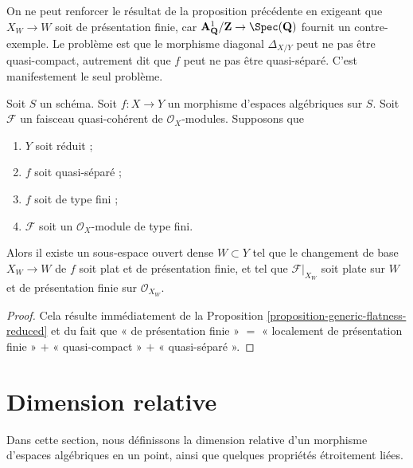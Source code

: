 \noindent
On ne peut renforcer le résultat de la proposition précédente en exigeant que
$X_W \to W$ soit de présentation finie, car
$\mathbf{A}^1_{\mathbf{Q}}/\mathbf{Z} \to \Spec(\mathbf{Q})$
fournit un contre-exemple. Le problème est que le morphisme diagonal
$\Delta_{X/Y}$ peut ne pas être quasi-compact, autrement dit que $f$ peut ne pas être
quasi-séparé. C'est manifestement le seul problème.

\begin{proposition}
\label{proposition-generic-flatness-reduced-quasi-separated}
Soit $S$ un schéma.
Soit $f : X \to Y$ un morphisme d'espaces algébriques sur $S$.
Soit $\mathcal{F}$ un faisceau quasi-cohérent de $\mathcal{O}_X$-modules.
Supposons que
\begin{enumerate}
\item $Y$ soit réduit ;
\item $f$ soit quasi-séparé ;
\item $f$ soit de type fini ;
\item $\mathcal{F}$ soit un $\mathcal{O}_X$-module de type fini.
\end{enumerate}
Alors il existe un sous-espace ouvert dense $W \subset Y$ tel que
le changement de base $X_W \to W$ de $f$ soit plat et de présentation finie,
et tel que $\mathcal{F}|_{X_W}$ soit plate sur $W$ et de
présentation finie sur $\mathcal{O}_{X_W}$.
\end{proposition}

\begin{proof}
Cela résulte immédiatement de la
Proposition \ref{proposition-generic-flatness-reduced}
et du fait que « de présentation finie » $=$
« localement de présentation finie » $+$ « quasi-compact » $+$
« quasi-séparé ».
\end{proof}















\section{Dimension relative}
\label{section-relative-dimension}

\noindent
Dans cette section, nous définissons la dimension relative
d'un morphisme d'espaces algébriques en un point, ainsi que quelques
propriétés étroitement liées.

